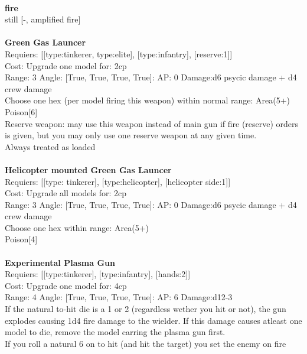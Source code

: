 \ \\ {\bf fire } \\
still [-, amplified fire] \\

\ \\
{\bf Green Gas Launcer } \\

Requiers: [[type:tinkerer, type:elite], [type:infantry], [reserve:1]] \\
Cost: Upgrade one model for: 2cp \\


Range: 3  Angle: [True, True, True, True]: AP: 0 Damage:d6 psycic damage + d4 crew damage \\
Choose one hex (per model firing this weapon) within normal range: Area(5+)\\ 
Poison[6]\\ 
Reserve weapon: may use this weapon instead of main gun if fire (reserve) orders is given, but you may only use one reserve weapon at any given time.\\ 
Always treated as loaded\\ 








\ \\
{\bf Helicopter mounted Green Gas Launcer } \\

Requiers: [[type: tinkerer], [type:helicopter], [helicopter side:1]] \\
Cost: Upgrade all models for: 2cp \\


Range: 3  Angle: [True, True, True, True]: AP: 0 Damage:d6 psycic damage + d4 crew damage \\
Choose one hex within range: Area(5+)\\ 
Poison[4]\\ 








\ \\
{\bf Experimental Plasma Gun } \\

Requiers: [[type:tinkerer], [type:infantry], [hands:2]] \\
Cost: Upgrade one model for: 4cp \\


Range: 4  Angle: [True, True, True, True]: AP: 6 Damage:d12-3 \\
If the natural to-hit die is a 1 or 2 (regardless wether you hit or not), the gun explodes causing 1d4 fire damage to the wielder. If this damage causes atleast one model to die, remove the model carring the plasma gun first.\\ 
If you roll a natural 6 on to hit (and hit the target) you set the enemy on fire\\ 








